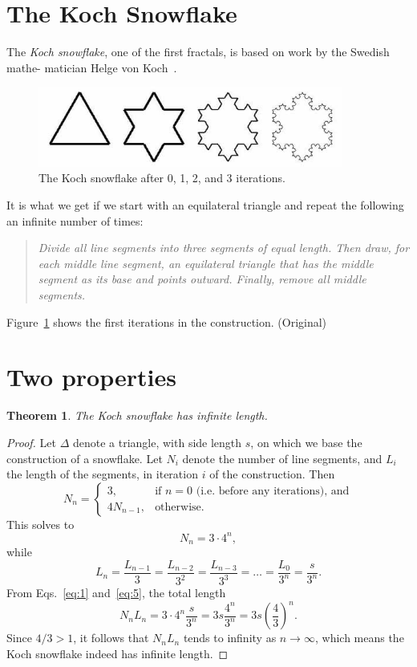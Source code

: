 \documentclass[12pt,a4paper]{article}
\newtheorem{theorem}{Theorem}
\begin{document}
\section{The Koch Snowflake}

The \emph{Koch snowflake},
one of the first fractals, is based on work by the Swedish mathe-
matician Helge von Koch~\cite{koch}.
\begin{figure}[h] \label{koch}
  \centering
	\includegraphics[width=10cm]{snowflake.jpg}
  \caption{The Koch snowflake after 0, 1, 2, and 3 iterations. }
\end{figure}
It is what we get if we start with an equilateral triangle and repeat the following an infinite number of times:
\begin{quote}
\textit{Divide all line segments into three segments of equal length. Then draw, for each middle line segment, an equilateral triangle that has the middle segment as its base and points outward. Finally, remove all middle segments. }
\end{quote}
Figure~\ref{koch} shows the first iterations in the construction. \hfill (Original)
\section{Two properties}
\begin{theorem}
  The Koch snowflake has infinite length. 
\end{theorem}
\begin{proof}
   Let $\Delta$ denote a triangle, with side length $s$, on which we base the construction of a snowflake. Let $N_i$ denote the number of line segments, and $L_i$ the length of the segments, in iteration $i$ of the construction. Then 
  \begin{displaymath}
    N_n=
    \begin{cases}
      3,       &\text{if $n=0$ (i.e.~before any iterations), and} \\ 
      4N_{n-1},&\text{otherwise.}
    \end{cases}
  \end{displaymath}
  This solves to
  \begin{equation}
    \label{eq:1}
    N_n = 3 \cdot 4^n,
  \end{equation}
   while
  \begin{equation}
    \label{eq:5}
    L_n = \frac{L_{n-1}}{3} = \frac{L_{n-2}}{3^2} = \frac{L_{n-3}}{3^3} = \ldots = \frac{L_0}{3^n} = \frac{s}{3^n}.
  \end{equation}
  From Eqs.~\ref{eq:1}  and~\ref{eq:5}, the total length
  \begin{displaymath}
    N_nL_n = 3 \cdot 4^n\frac{s}{3^n} = 3s\frac{4^n}{3^n} = 3s\left(\frac{4}{3}\right)^n.
  \end{displaymath}
  Since $4/3 > 1$, it follows that $N_nL_n$ tends to infinity as $n \to \infty$, which means the Koch snowflake indeed has infinite length.
\end{proof}
\end{document}
